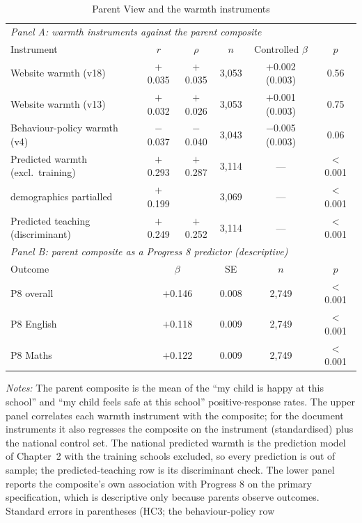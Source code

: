 \begin{table}[htbp]\centering
\caption{Parent View and the warmth instruments}
\label{tab:parentview}
\def\sym#1{\ifmmode^{#1}\else\(^{#1}\)\fi}
\small
\footnotesize\setlength{\tabcolsep}{4pt}
\begin{tabular}{lccccc}
\toprule
\multicolumn{6}{l}{\textit{Panel A: warmth instruments against the parent composite}} \\
\addlinespace[2pt]
Instrument & $r$ & $\rho$ & $n$ & Controlled $\beta$ & $p$ \\
\midrule
Website warmth (v18) & $+$0.035 & $+$0.035 & 3{,}053 & $+$0.002 (0.003) & 0.56 \\
Website warmth (v13) & $+$0.032 & $+$0.026 & 3{,}053 & $+$0.001 (0.003) & 0.75 \\
Behaviour-policy warmth (v4) & $-$0.037 & $-$0.040 & 3{,}043 & $-$0.005 (0.003) & 0.06 \\
Predicted warmth (excl.\ training) & $+$0.293 & $+$0.287 & 3{,}114 & --- & $<$0.001 \\
\quad demographics partialled & $+$0.199 & & 3{,}069 & --- & $<$0.001 \\
Predicted teaching (discriminant) & $+$0.249 & $+$0.252 & 3{,}114 & --- & $<$0.001 \\
\midrule
\multicolumn{6}{l}{\textit{Panel B: parent composite as a Progress 8 predictor (descriptive)}} \\
\addlinespace[2pt]
Outcome & \multicolumn{2}{c}{$\beta$} & SE & $n$ & $p$ \\
\midrule
P8 overall & \multicolumn{2}{c}{$+$0.146} & 0.008 & 2{,}749 & $<$0.001 \\
P8 English & \multicolumn{2}{c}{$+$0.118} & 0.009 & 2{,}749 & $<$0.001 \\
P8 Maths & \multicolumn{2}{c}{$+$0.122} & 0.009 & 2{,}749 & $<$0.001 \\
\bottomrule
\end{tabular}
\begin{minipage}{\linewidth}
\smallskip
\footnotesize\textit{Notes:} The parent composite is the mean of the ``my child is happy at this school'' and ``my child feels safe at this school'' positive-response rates. The upper panel correlates each warmth instrument with the composite; for the document instruments it also regresses the composite on the instrument (standardised) plus the national control set. The national predicted warmth is the prediction model of Chapter~2 with the training schools excluded, so every prediction is out of sample; the predicted-teaching row is its discriminant check. The lower panel reports the composite's own association with Progress 8 on the primary specification, which is descriptive only because parents observe outcomes. Standard errors in parentheses (HC3; the behaviour-policy row

\end{minipage}
\end{table}
